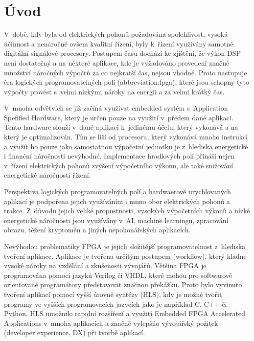 \documentclass[a4paper, twoside, 11pt]{article}
\begin{document}
\null\newpage
\null\newpage %
\setcounter{page}{1}

\section{Úvod}
V~době, kdy byla od elektrických pohonů požadována spolehlivost, vysoká účinnost a nenáročné ovšem kvalitní řízení, byly k~řízení využívány samotné digitální signálové procesory. Postupem času dochází ke zjištění, že výkon DSP není dostatečný a na některé aplikace, kde je vyžadováno provedení značné množství náročných výpočtů za co nejkratší čas, nejsou vhodné. Proto nastupuje éra logických programovatelných polí (\gls{abbreviation:fpga}), které jsou schopny tyto výpočty provést s~velmi nízkými nároky na energii a za velmi krátký čas.\par
V~mnoha odvětvích se již začíná využívat embedded systém s~Application Spefified Hardware, který je určen pouze na využití v~předem dané aplikaci. Tento hardware slouží v~dané aplikaci k~jedinému účelu, který vykonává a na který je optimalizován. Tím se liší od procesoru, který vykonává mnoho instrukcí a využít ho pouze jako samostatnou výpočetní jednotku je z~hlediska energetické i finanční náročnosti nevýhodné. Implementace hradlových polí přináší nejen v~řízení elektrických pohonů zvýšení výpočetního výkonu, ale také snižování energetické náročnosti řízení.\par
Perspektiva logických programovatelných polí a hardwaerově urychlovaných aplikací je podpořena jejich využíváním i mimo obor elektrických pohonů a trakce. Z~důvodu jejich veliké propustnosti, vysokých výpočetních výkonů a nízké energetické náročnosti jsou využívány v~AI, machine learningu, zpracování obrazu, těžení kryptoměn a jiných nepohonářských aplikacích.\par
Nevýhodou problematiky FPGA je jejich složitější programovatelnost z~hlediska tvoření aplikace. Aplikace je tvořena určitým postupem (workflow), který kladne vysoké nároky na vzdělání a zkušenosti vývojářů. Většina FPGA je programována pomocí jazyků Verilog či VHDL, které mohou pro softwarově orientované programátory představovat značnou překážku. Proto bylo vyvinuto tvoření aplikací pomocí vyšší úrovně syntézy (HLS), kdy je možné tvořit programy ve vyšších programovacích jazycích jako je například C, C++ či Python. HLS umožnilo rapidní rozšíření a využití Embedded FPGA Accelerated Applications v~mnoha aplikacích a značně vylepšilo vývojářský požitek (developer experience, DX) při tvorbě aplikací.\par
\end{document}
